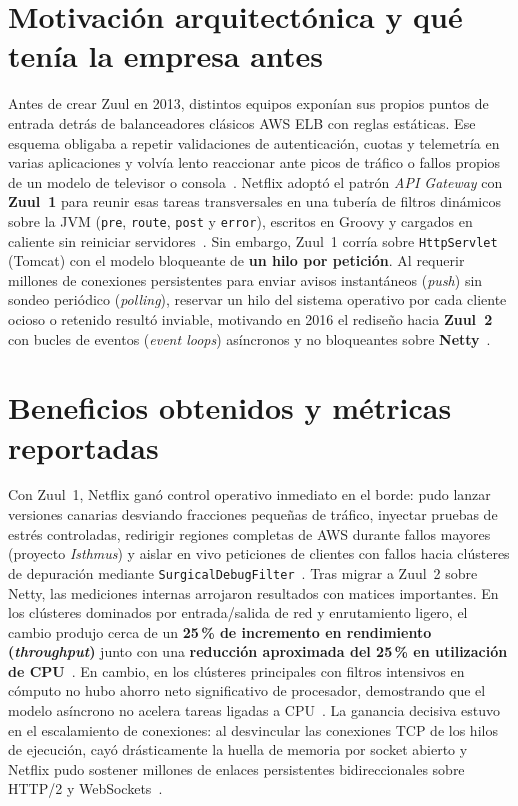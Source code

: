 \documentclass[10pt,a4paper]{article}
\begin{document}
\section{Motivación arquitectónica y qué tenía la empresa antes}
Antes de crear Zuul en 2013, distintos equipos exponían sus propios puntos de entrada detrás de balanceadores clásicos AWS ELB con reglas estáticas. Ese esquema obligaba a repetir validaciones de autenticación, cuotas y telemetría en varias aplicaciones y volvía lento reaccionar ante picos de tráfico o fallos propios de un modelo de televisor o consola~\cite{cohen2013zuul,haindl2024security}. Netflix adoptó el patrón \emph{API Gateway} con \textbf{Zuul~1} para reunir esas tareas transversales en una tubería de filtros dinámicos sobre la JVM (\texttt{pre}, \texttt{route}, \texttt{post} y \texttt{error}), escritos en Groovy y cargados en caliente sin reiniciar servidores~\cite{cohen2013zuul}. Sin embargo, Zuul~1 corría sobre \texttt{HttpServlet} (Tomcat) con el modelo bloqueante de \textbf{un hilo por petición}. Al requerir millones de conexiones persistentes para enviar avisos instantáneos (\emph{push}) sin sondeo periódico (\emph{polling}), reservar un hilo del sistema operativo por cada cliente ocioso o retenido resultó inviable, motivando en 2016 el rediseño hacia \textbf{Zuul~2} con bucles de eventos (\emph{event loops}) asíncronos y no bloqueantes sobre \textbf{Netty}~\cite{gonigberg2016zuul2,dhawan2026gateway}.

\section{Beneficios obtenidos y métricas reportadas}
Con Zuul~1, Netflix ganó control operativo inmediato en el borde: pudo lanzar versiones canarias desviando fracciones pequeñas de tráfico, inyectar pruebas de estrés controladas, redirigir regiones completas de AWS durante fallos mayores (proyecto \emph{Isthmus}) y aislar en vivo peticiones de clientes con fallos hacia clústeres de depuración mediante \texttt{SurgicalDebugFilter}~\cite{cohen2013zuul}. Tras migrar a Zuul~2 sobre Netty, las mediciones internas arrojaron resultados con matices importantes. En los clústeres dominados por entrada/salida de red y enrutamiento ligero, el cambio produjo cerca de un \textbf{25\,\% de incremento en rendimiento (\emph{throughput})} junto con una \textbf{reducción aproximada del 25\,\% en utilización de CPU}~\cite{gonigberg2016zuul2}. En cambio, en los clústeres principales con filtros intensivos en cómputo no hubo ahorro neto significativo de procesador, demostrando que el modelo asíncrono no acelera tareas ligadas a CPU~\cite{gonigberg2016zuul2,santos2025catalog}. La ganancia decisiva estuvo en el escalamiento de conexiones: al desvincular las conexiones TCP de los hilos de ejecución, cayó drásticamente la huella de memoria por socket abierto y Netflix pudo sostener millones de enlaces persistentes bidireccionales sobre HTTP/2 y WebSockets~\cite{gonigberg2016zuul2,dhawan2026gateway}.
\end{document}
